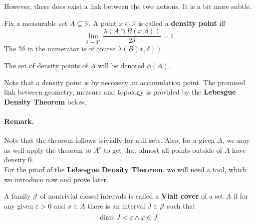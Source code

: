 However, there does exist a link between the two notions. It is a bit more subtle.

\begin{defn}
    Fix a measurable set \( A \subseteq \mathbb{R} \). A point \( x \in \mathbb{R} \) is called a \textbf{density point} iff
    \[ 
        \lim_{\delta \to 0^+} \frac{\lambda(A \cap B(x, \delta))}{2\delta} = 1.
   \]
   The \( 2\delta \) in the numerator is of course \( \lambda(B(x, \delta)) \).
\end{defn}
\begin{defn}
    The set of density points of \( A \) will be denoted \( \phi(A) \).
\end{defn}


Note that a density point is by neccesity an accumulation point. The promised link between geometry, measure and topology is provided by the \textbf{Lebesgue Density Theorem} below.

\paragraph{Remark.} Note that the theorem follows trivially for null sets. Also, for a given \( A \), we may as well apply the theorem to \( A^c \) to get that almost all points outside of \( A \) have density \( 0 \).
\\

For the proof of the \textbf{Lebesgue Density Theorem}, we will need a tool, which we introduce now and prove later.
\begin{defn}
    A family \(\mathcal{J} \) of nontrivial closed intervals is called a \textbf{Viali cover} of a set \( A \) if for any given \(\varepsilon > 0 \) and \( x \in A \) there is an interval \( J \in \mathcal{J} \) such that
    \[ 
       \operatorname{diam} J <\varepsilon \wedge x \in J.
   \]
\end{defn}

